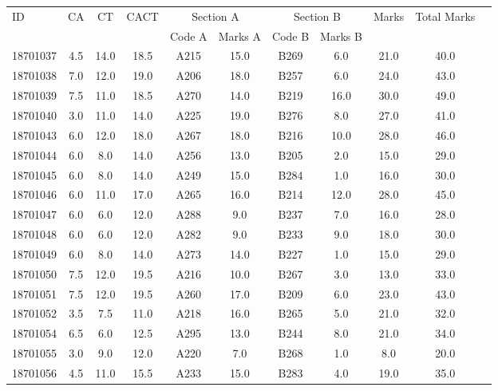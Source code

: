 \documentclass[12pt]{article}
\begin{document}
    \begin{center} 
	\renewcommand{\arraystretch}{1.08}
	\begin{small}
    \begin{tabular}{|l|c|c|c|c|c|c|c|c|c|c|} \hline
	\multirow{2}{*}{ID} & 	\multirow{2}{*}{CA}  & 	\multirow{2}{*}{CT}  & 	\multirow{2}{*}{CACT}  & \multicolumn{2 }{c|}{Section A}& \multicolumn{2 }{c|}{Section B} & 	\multirow{2}{*}{Marks}  & 	\multirow{2}{*}{Total Marks}  \\ 
	&  &  &  & Code A & Marks A & Code B & Marks B&  &  \\ \hline
18701037 & 4.5 & 14.0 & 18.5 & A215 & 15.0 & B269 & 6.0 & 21.0 & 40.0\\ \hline 
18701038 & 7.0 & 12.0 & 19.0 & A206 & 18.0 & B257 & 6.0 & 24.0 & 43.0\\ \hline 
18701039 & 7.5 & 11.0 & 18.5 & A270 & 14.0 & B219 & 16.0 & 30.0 & 49.0\\ \hline 
18701040 & 3.0 & 11.0 & 14.0 & A225 & 19.0 & B276 & 8.0 & 27.0 & 41.0\\ \hline 
18701043 & 6.0 & 12.0 & 18.0 & A267 & 18.0 & B216 & 10.0 & 28.0 & 46.0\\ \hline 
18701044 & 6.0 & 8.0 & 14.0 & A256 & 13.0 & B205 & 2.0 & 15.0 & 29.0\\ \hline 
18701045 & 6.0 & 8.0 & 14.0 & A249 & 15.0 & B284 & 1.0 & 16.0 & 30.0\\ \hline 
18701046 & 6.0 & 11.0 & 17.0 & A265 & 16.0 & B214 & 12.0 & 28.0 & 45.0\\ \hline 
18701047 & 6.0 & 6.0 & 12.0 & A288 & 9.0 & B237 & 7.0 & 16.0 & 28.0\\ \hline 
18701048 & 6.0 & 6.0 & 12.0 & A282 & 9.0 & B233 & 9.0 & 18.0 & 30.0\\ \hline 
18701049 & 6.0 & 8.0 & 14.0 & A273 & 14.0 & B227 & 1.0 & 15.0 & 29.0\\ \hline 
18701050 & 7.5 & 12.0 & 19.5 & A216 & 10.0 & B267 & 3.0 & 13.0 & 33.0\\ \hline 
18701051 & 7.5 & 12.0 & 19.5 & A260 & 17.0 & B209 & 6.0 & 23.0 & 43.0\\ \hline 
18701052 & 3.5 & 7.5 & 11.0 & A218 & 16.0 & B265 & 5.0 & 21.0 & 32.0\\ \hline 
18701054 & 6.5 & 6.0 & 12.5 & A295 & 13.0 & B244 & 8.0 & 21.0 & 34.0\\ \hline 
18701055 & 3.0 & 9.0 & 12.0 & A220 & 7.0 & B268 & 1.0 & 8.0 & 20.0\\ \hline 
18701056 & 4.5 & 11.0 & 15.5 & A233 & 15.0 & B283 & 4.0 & 19.0 & 35.0\\ \hline 

\end{tabular}
\end{small}
\end{center}
\end{document}

